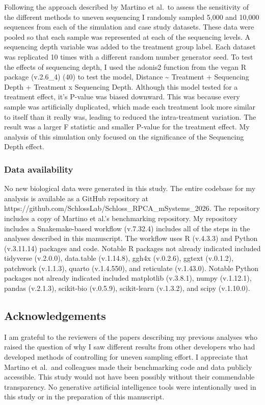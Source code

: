 \documentclass[
  11pt,
]{article}
\begin{document}
Following the approach described by Martino et al.~to assess the
sensitivity of the different methods to uneven sequencing I randomly
sampled 5,000 and 10,000 sequences from each of the simulation and case
study datasets. These data were pooled so that each sample was
represented at each of the sequencing levels. A sequencing depth
variable was added to the treatment group label. Each dataset was
replicated 10 times with a different random number generator seed. To
test the effects of sequencing depth, I used the adonis2 function from
the vegan R package (v.2.6\_4) (40) to test the model, Distance
\textasciitilde{} Treatment + Sequencing Depth + Treatment x Sequencing
Depth. Although this model tested for a treatment effect, it's P-value
was biased downward. This was because every sample was artificially
duplicated, which made each treatment look more similar to itself than
it really was, leading to reduced the intra-treatment variation. The
result was a larger F statistic and smaller P-value for the treatment
effect. My analysis of this simulation only focused on the significance
of the Sequencing Depth effect.

\subsubsection{Data availability}\label{data-availability}

No new biological data were generated in this study. The entire codebase
for my analysis is available as a GitHub repository at
https://github.com/SchlossLab/Schloss\_RPCA\_mSystems\_2026. The
repository includes a copy of Martino et al.'s benchmarking repository.
My repository includes a Snakemake-based workflow (v.7.32.4) includes
all of the steps in the analyses described in this manuscript. The
workflow uses R (v.4.3.3) and Python (v.3.11.14) packages and code.
Notable R packages not already indicated included tidyverse (v.2.0.0),
data.table (v.1.14.8), ggh4x (v.0.2.6), ggtext (v.0.1.2), patchwork
(v.1.1.3), quarto (v.1.4.550), and reticulate (v.1.43.0). Notable Python
packages not already indicated included matplotlib (v.3.8.1), numpy
(v.1.12.1), pandas (v.2.1.3), scikit-bio (v.0.5.9), scikit-learn
(v.1.3.2), and scipy (v.1.10.0).

\subsection{Acknowledgements}\label{acknowledgements}

I am grateful to the reviewers of the papers describing my previous
analyses who raised the question of why I saw different results from
other developers who had developed methods of controlling for uneven
sampling effort. I appreciate that Martino et al.~and colleagues made
their benchmarking code and data publicly accessible. This study would
not have been possibly without their commendable transparency. No
generative artificial intelligence tools were intentionally used in this
study or in the preparation of this manuscript.
\end{document}
